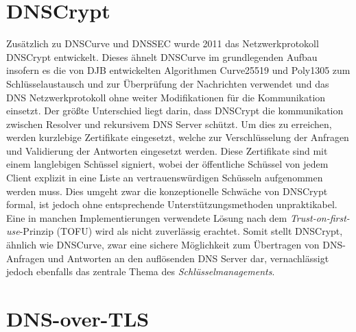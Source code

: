 \section{DNSCrypt}

Zusätzlich zu DNSCurve und DNSSEC wurde 2011 das Netzwerkprotokoll DNSCrypt entwickelt. Dieses ähnelt DNSCurve im grundlegenden Aufbau insofern es die von DJB entwickelten Algorithmen Curve25519 und Poly1305 zum Schlüsselaustausch und zur Überprüfung der Nachrichten verwendet und das DNS Netzwerkprotokoll ohne weiter Modifikationen für die Kommunikation einsetzt. Der größte Unterschied liegt darin, dass DNSCrypt die kommunikation zwischen Resolver und rekursivem DNS Server schützt. Um dies zu erreichen, werden kurzlebige Zertifikate eingesetzt, welche zur Verschlüsselung der Anfragen und Validierung der Antworten eingesetzt werden. Diese Zertifikate sind mit einem langlebigen Schüssel signiert, wobei der öffentliche Schüssel von jedem Client explizit in eine Liste an vertrauenswürdigen Schüsseln aufgenommen werden muss.\cite{Denis2016} Dies umgeht zwar die konzeptionelle Schwäche von DNSCrypt formal, ist jedoch ohne entsprechende Unterstützungsmethoden unpraktikabel. Eine in manchen Implementierungen verwendete Lösung nach dem \textit{Trust-on-first-use}-Prinzip (TOFU) wird als nicht zuverlässig erachtet.\cite{Wendlandt2008} Somit stellt DNSCrypt, ähnlich wie DNSCurve, zwar eine sichere  Möglichkeit zum Übertragen von DNS-Anfragen und Antworten an den auflösenden DNS Server dar, vernachlässigt jedoch ebenfalls das zentrale Thema des \textit{Schlüsselmanagements}.    

\section{DNS-over-TLS}

